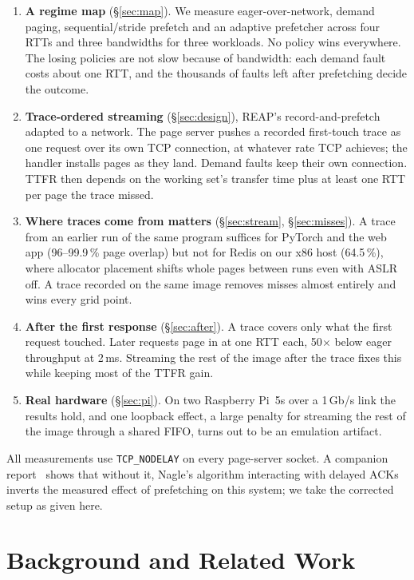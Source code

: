 \documentclass[conference]{IEEEtran}
\begin{document}
\begin{enumerate}
\item \textbf{A regime map} (\S\ref{sec:map}). We measure eager-over-network,
demand paging, sequential/stride prefetch and an adaptive prefetcher across
four RTTs and three bandwidths for three workloads. No policy wins
everywhere. The losing policies are not slow because of bandwidth: each
demand fault costs about one RTT, and the thousands of faults left after
prefetching decide the outcome.
\item \textbf{Trace-ordered streaming} (\S\ref{sec:design}), REAP's
record-and-prefetch~\cite{ustiugov2021reap} adapted to a network. The page server
pushes a recorded first-touch trace as one request over its own TCP
connection, at whatever rate TCP achieves; the handler installs pages as
they land. Demand faults keep their own connection. TTFR then depends on
the working set's transfer time plus at least one RTT per page the trace missed.
\item \textbf{Where traces come from matters} (\S\ref{sec:stream},
\S\ref{sec:misses}). A trace from an earlier run of the same program
suffices for PyTorch and the web app (96--99.9\,\% page overlap) but not for
Redis on our x86 host (64.5\,\%), where allocator placement shifts whole
pages between runs even with ASLR off. A trace recorded on the same image
removes misses almost entirely and wins every grid point.
\item \textbf{After the first response} (\S\ref{sec:after}). A trace covers
only what the first request touched. Later requests page in at one RTT
each, 50$\times$ below eager throughput at 2\,ms. Streaming the rest of the
image after the trace fixes this while keeping most of the TTFR gain.
\item \textbf{Real hardware} (\S\ref{sec:pi}). On two Raspberry Pi~5s
over a 1\,Gb/s link the results hold, and one loopback effect, a large
penalty for streaming the rest of the image through a shared FIFO, turns
out to be an emulation artifact.
\end{enumerate}

All measurements use \texttt{TCP\_NODELAY} on every page-server socket. A
companion report~\cite{pitfall} shows that without it, Nagle's algorithm
interacting with delayed ACKs inverts the measured effect of prefetching on
this system; we take the corrected setup as given here.

\section{Background and Related Work}
\end{document}
